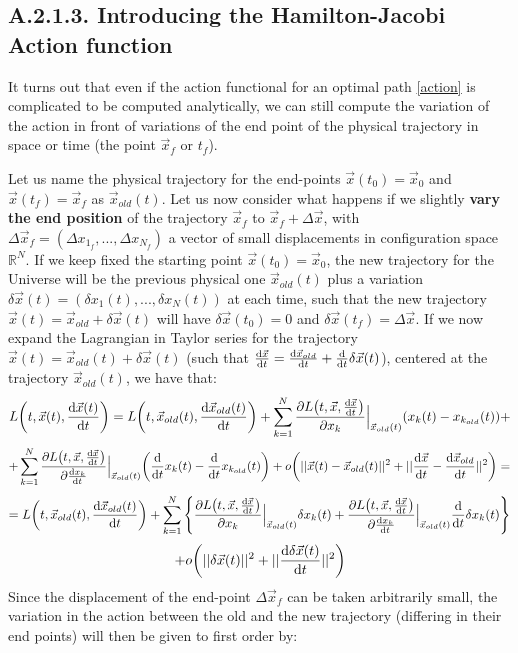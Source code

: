 \documentclass[11pt, a4paper]{article} %
\newcommand{\R}{\mathbb{R}} %
\begin{document}
\subsection*{A.2.1.3. Introducing the Hamilton-Jacobi Action function}
It turns out that even if the action functional for an optimal path \eqref{action} is complicated to be computed analytically, we can still compute the variation of the action in front of variations of the end point of the physical trajectory in space or time (the point $\vec{x}_f$ or $t_f$).

Let us name the physical trajectory for the end-points $\vec{x}(t_0)=\vec{x}_0$ and $\vec{x}(t_f)=\vec{x}_f$ as $\vec{x}_{old}(t)$. Let us now consider what happens if we slightly {\bf vary the end position} of the trajectory $\vec{x}_f$ to $\vec{x}_f+\Delta\vec{x}$, with $\Delta\vec{x}_f=(\Delta x_{1_f}, ..., \Delta x_{N_f})$ a vector of small displacements in configuration space $\R^N$. If we keep fixed the starting point $\vec{x}(t_0)=\vec{x}_0$, the new trajectory for the Universe will be the previous physical one $\vec{x}_{old}(t)$ plus a variation $\delta \vec{x}(t)=(\delta x_1(t),...,\delta x_N(t))$ at each time, such that the new trajectory $\vec{x}(t)=\vec{x}_{old}+\delta \vec{x}(t)$ will have $\delta \vec{x}(t_0)=0$ and $\delta \vec{x}(t_f)=\Delta\vec{x}$. If we now expand the Lagrangian in Taylor series for the trajectory $\vec{x}(t)=\vec{x}_{old}(t)+\delta\vec{x}(t)$ (such that $\dv{\vec{x}}{t}(t)=\dv{\vec{x}_{old}}{t} (t)+\dv{}{t}\delta \vec{x}(t)$), centered at the trajectory $\vec{x}_{old}(t)$, we have that:
\begin{equation}
L\qty(t, \vec{x}(t), \dv{\vec{x}(t)}{t})=L\qty(t, \vec{x}_{old}(t), \dv{\vec{x}_{old}(t)}{t})+\sum_{k=1}^N \pdv{L\qty(t, \vec{x}, \dv{\vec{x}}{t})}{x_k}\Big\rvert_{\vec{x}_{old}(t)}\qty(x_k(t)-x_{k_{old}}(t))+
\end{equation}
$$
+\sum_{k=1}^N \pdv{L\qty(t, \vec{x}, \dv{\vec{x}}{t})}{\dv{x_k}{t}}\Big\rvert_{\vec{x}_{old} (t)}\qty(\dv{}{t}x_k(t)-\dv{}{t}x_{k_{old}}(t))+
o\qty(||\vec{x}(t)-\vec{x}_{old}(t)||^2+||\dv{\vec{x}}{t} (t)-\dv{\vec{x}_{old}}{t} (t) ||^2)=
$$
$$
=L\qty(t, \vec{x}_{old}(t), \dv{\vec{x}_{old}(t)}{t})+\sum_{k=1}^N \qty{\pdv{L\qty(t, \vec{x}, \dv{\vec{x}}{t})}{x_k}\Big\rvert_{\vec{x}_{old}(t)}\delta x_k(t)+\pdv{L\qty(t, \vec{x}, \dv{\vec{x}}{t})}{\dv{x_k}{t}}\Big\rvert_{\vec{x}_{old}(t)}\dv{}{t}\delta x_k(t)}
$$
$$
+o\qty(||\delta\vec{x}(t)||^2+||\dv{\delta \vec{x}(t)}{t}||^2)
$$
Since the displacement of the end-point $\Delta \vec{x}_f$ can be taken arbitrarily small, the variation in the action between the old and the new trajectory (differing in their end points) will then be given to first order by:
\end{document}
